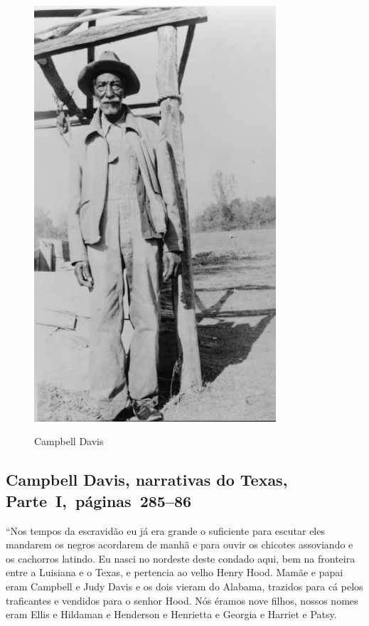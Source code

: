 \begin{figure}[]
\centering
 \includegraphics[width=90mm]{./imgs/campbelldavis_recorte.jpg} \label{img6}
\caption{Campbell Davis}
\end{figure}	

\subsection{Campbell Davis, narrativas do Texas, Parte~I,~páginas~285--86} \label{ref68}

``Nos tempos da escravidão eu já era grande o suficiente para escutar
eles mandarem os negros acordarem de manhã e para ouvir os chicotes
assoviando e os cachorros latindo. Eu nasci no nordeste deste condado
aqui, bem na fronteira entre a Luisiana e o Texas, e pertencia ao velho
Henry Hood. Mamãe e papai eram Campbell e Judy Davis e os dois vieram do
Alabama, trazidos para cá pelos traficantes e vendidos para o senhor
Hood. Nós éramos nove filhos, nossos nomes eram Ellis e Hildaman e
Henderson e Henrietta e Georgia e Harriet e Patsy.

